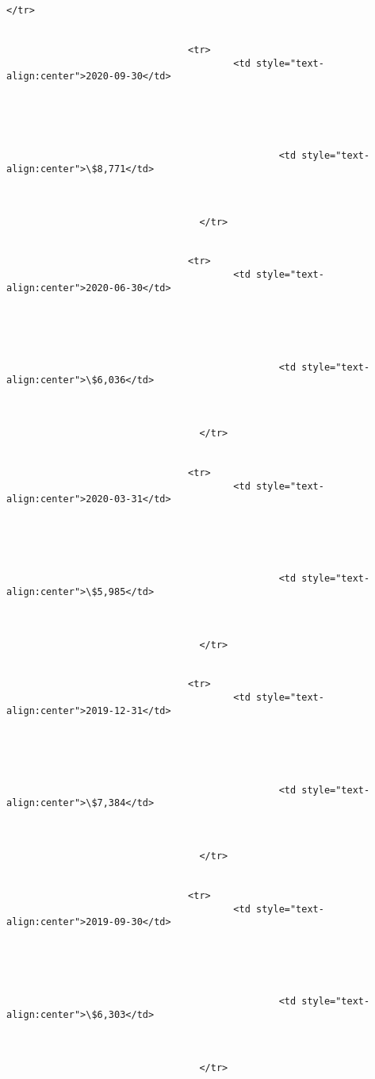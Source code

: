 \documentclass[11pt]{article}
\begin{document}
\begin{Verbatim}[commandchars=\\\{\}]
                                  </tr>


                                <tr>
                                        <td style="text-
align:center">2020-09-30</td>





                                                <td style="text-
align:center">\$8,771</td>



                                  </tr>


                                <tr>
                                        <td style="text-
align:center">2020-06-30</td>





                                                <td style="text-
align:center">\$6,036</td>



                                  </tr>


                                <tr>
                                        <td style="text-
align:center">2020-03-31</td>





                                                <td style="text-
align:center">\$5,985</td>



                                  </tr>


                                <tr>
                                        <td style="text-
align:center">2019-12-31</td>





                                                <td style="text-
align:center">\$7,384</td>



                                  </tr>


                                <tr>
                                        <td style="text-
align:center">2019-09-30</td>





                                                <td style="text-
align:center">\$6,303</td>



                                  </tr>



\end{Verbatim}
\end{document}
